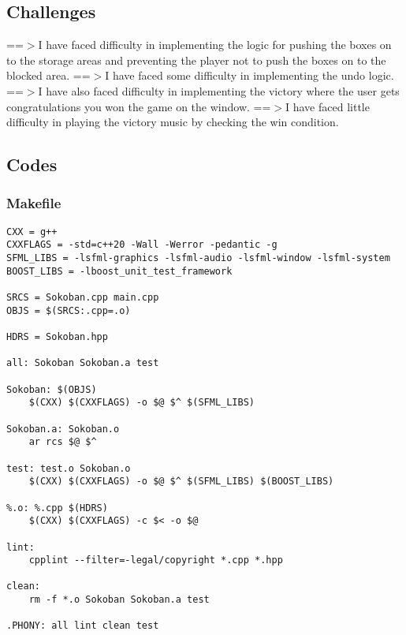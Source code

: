 \documentclass[12pt]{article}
\begin{document}
\subsection{Challenges}
==$>$I have faced difficulty in implementing the logic for pushing the boxes on to the storage areas and preventing the player not to push the boxes on to the blocked area.
\newline
==$>$I have faced some difficulty in implementing the undo logic.
\newline
==$>$I have also faced difficulty in implementing the victory where the user gets congratulations you won the game on the window.
\newline
==$>$I have faced little difficulty in playing the victory music by checking the win condition.

\subsection{Codes}

\subsubsection{Makefile}
\begin{lstlisting}[style=cppcode]
CXX = g++
CXXFLAGS = -std=c++20 -Wall -Werror -pedantic -g
SFML_LIBS = -lsfml-graphics -lsfml-audio -lsfml-window -lsfml-system
BOOST_LIBS = -lboost_unit_test_framework

SRCS = Sokoban.cpp main.cpp
OBJS = $(SRCS:.cpp=.o)

HDRS = Sokoban.hpp

all: Sokoban Sokoban.a test

Sokoban: $(OBJS)
	$(CXX) $(CXXFLAGS) -o $@ $^ $(SFML_LIBS)

Sokoban.a: Sokoban.o
	ar rcs $@ $^

test: test.o Sokoban.o
	$(CXX) $(CXXFLAGS) -o $@ $^ $(SFML_LIBS) $(BOOST_LIBS)

%.o: %.cpp $(HDRS)
	$(CXX) $(CXXFLAGS) -c $< -o $@

lint:
	cpplint --filter=-legal/copyright *.cpp *.hpp

clean:
	rm -f *.o Sokoban Sokoban.a test

.PHONY: all lint clean test
\end{lstlisting}
\end{document}
